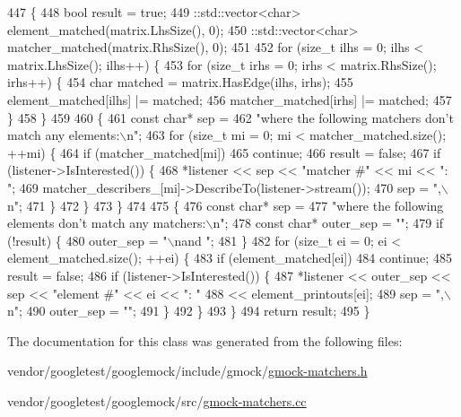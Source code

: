 \begin{DoxyCode}
447                                          \{
448   \textcolor{keywordtype}{bool} result = \textcolor{keyword}{true};
449   ::std::vector<char> element\_matched(matrix.LhsSize(), 0);
450   ::std::vector<char> matcher\_matched(matrix.RhsSize(), 0);
451 
452   \textcolor{keywordflow}{for} (\textcolor{keywordtype}{size\_t} ilhs = 0; ilhs < matrix.LhsSize(); ilhs++) \{
453     \textcolor{keywordflow}{for} (\textcolor{keywordtype}{size\_t} irhs = 0; irhs < matrix.RhsSize(); irhs++) \{
454       \textcolor{keywordtype}{char} matched = matrix.HasEdge(ilhs, irhs);
455       element\_matched[ilhs] |= matched;
456       matcher\_matched[irhs] |= matched;
457     \}
458   \}
459 
460   \{
461     \textcolor{keyword}{const} \textcolor{keywordtype}{char}* sep =
462         \textcolor{stringliteral}{"where the following matchers don't match any elements:\(\backslash\)n"};
463     \textcolor{keywordflow}{for} (\textcolor{keywordtype}{size\_t} mi = 0; mi < matcher\_matched.size(); ++mi) \{
464       \textcolor{keywordflow}{if} (matcher\_matched[mi])
465         \textcolor{keywordflow}{continue};
466       result = \textcolor{keyword}{false};
467       \textcolor{keywordflow}{if} (listener->IsInterested()) \{
468         *listener << sep << \textcolor{stringliteral}{"matcher #"} << mi << \textcolor{stringliteral}{": "};
469         matcher\_describers\_[mi]->DescribeTo(listener->stream());
470         sep = \textcolor{stringliteral}{",\(\backslash\)n"};
471       \}
472     \}
473   \}
474 
475   \{
476     \textcolor{keyword}{const} \textcolor{keywordtype}{char}* sep =
477         \textcolor{stringliteral}{"where the following elements don't match any matchers:\(\backslash\)n"};
478     \textcolor{keyword}{const} \textcolor{keywordtype}{char}* outer\_sep = \textcolor{stringliteral}{""};
479     \textcolor{keywordflow}{if} (!result) \{
480       outer\_sep = \textcolor{stringliteral}{"\(\backslash\)nand "};
481     \}
482     \textcolor{keywordflow}{for} (\textcolor{keywordtype}{size\_t} ei = 0; ei < element\_matched.size(); ++ei) \{
483       \textcolor{keywordflow}{if} (element\_matched[ei])
484         \textcolor{keywordflow}{continue};
485       result = \textcolor{keyword}{false};
486       \textcolor{keywordflow}{if} (listener->IsInterested()) \{
487         *listener << outer\_sep << sep << \textcolor{stringliteral}{"element #"} << ei << \textcolor{stringliteral}{": "}
488                   << element\_printouts[ei];
489         sep = \textcolor{stringliteral}{",\(\backslash\)n"};
490         outer\_sep = \textcolor{stringliteral}{""};
491       \}
492     \}
493   \}
494   \textcolor{keywordflow}{return} result;
495 \}
\end{DoxyCode}


The documentation for this class was generated from the following files\+:\begin{DoxyCompactItemize}
\item 
vendor/googletest/googlemock/include/gmock/\hyperlink{gmock-matchers_8h}{gmock-\/matchers.\+h}\item 
vendor/googletest/googlemock/src/\hyperlink{gmock-matchers_8cc}{gmock-\/matchers.\+cc}\end{DoxyCompactItemize}
